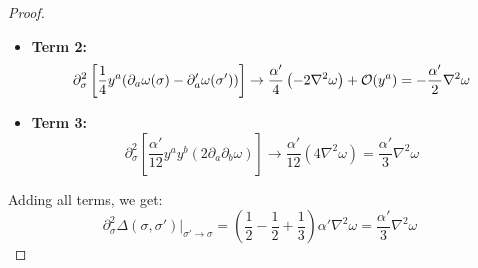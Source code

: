 \begin{tcolorbox}[breakable]
\begin{proof}
\begin{itemize}
				\item \textbf{Term 2:}
				\[ \partial^2_\sigma \left[ \frac{1}{4} y^a (\partial_a \omega(\sigma) - \partial'_a \omega(\sigma')) \right] \to \frac{\alpha'}{4} \left( -2 \nabla^2 \omega \right) +\order{y^a}= -\frac{\alpha'}{2} \nabla^2 \omega \]
				
				\item \textbf{Term 3:}
				\[ \partial^2_\sigma \left[ \frac{\alpha'}{12} y^a y^b (2 \partial_a \partial_b \omega) \right] \to \frac{\alpha'}{12} (4 \nabla^2 \omega) = \frac{\alpha'}{3} \nabla^2 \omega \]
			\end{itemize}
			Adding all terms, we get:
			\begin{equation}
				\partial^2_\sigma \Delta(\sigma, \sigma') \Big|_{\sigma' \to \sigma} = \left( \frac{1}{2} - \frac{1}{2} + \frac{1}{3} \right) \alpha' \nabla^2 \omega = \frac{\alpha'}{3} \nabla^2 \omega
			\end{equation}
			

\end{proof}
\end{tcolorbox}
